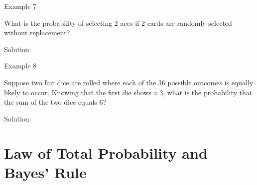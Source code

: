 \documentclass[
  ignorenonframetext,
]{beamer}
\begin{document}
\begin{frame}{Example 7}
\protect\hypertarget{example-7}{}
\begin{tcolorbox}
What is the probability of selecting 2 aces if 2 cards are randomly selected without replacement?
\end{tcolorbox}

\begin{tcolorbox}
Solution:


\vspace{30mm}

\end{tcolorbox}
\end{frame}

\begin{frame}{Example 8}
\protect\hypertarget{example-8}{}
\begin{tcolorbox}
Suppose two fair dice are rolled where each of the 36 possible outcomes is equally likely to occur. Knowing that the first die shows a 3, what is the probability that the sum of the two dice equals 6?
\end{tcolorbox}

\begin{tcolorbox}
Solution: 

\vspace{30mm}


\end{tcolorbox}
\end{frame}

\hypertarget{law-of-total-probability-and-bayes-rule}{%
\section{Law of Total Probability and Bayes'
Rule}\label{law-of-total-probability-and-bayes-rule}}
\end{document}
